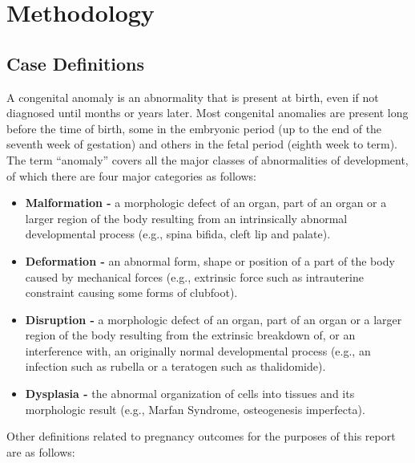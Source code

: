 \documentclass[
]{krantz}
\begin{document}
\mainmatter

\hypertarget{chapter1}{%
\chapter{Methodology}\label{chapter1}}

\hypertarget{section11}{%
\section{Case Definitions}\label{section11}}

A congenital anomaly is an abnormality that is present at birth, even if not diagnosed until months or years later. Most congenital anomalies are present long before the time of birth, some in the embryonic period (up to the end of the seventh week of gestation) and others in the fetal period (eighth week to term). The term ``anomaly'' covers all the major classes of abnormalities of development, of which there are four major categories as follows:

\begin{itemize}
\item
  \textbf{Malformation -} a morphologic defect of an organ, part of an organ or a larger region of the body resulting from an intrinsically abnormal developmental process (e.g., spina bifida, cleft lip and palate).
\item
  \textbf{Deformation -} an abnormal form, shape or position of a part of the body caused by mechanical forces (e.g., extrinsic force such as intrauterine constraint causing some forms of clubfoot).
\item
  \textbf{Disruption -} a morphologic defect of an organ, part of an organ or a larger region of the body resulting from the extrinsic breakdown of, or an interference with, an originally normal developmental process (e.g., an infection such as rubella or a teratogen such as thalidomide).
\item
  \textbf{Dysplasia -} the abnormal organization of cells into tissues and its morphologic result (e.g., Marfan Syndrome, osteogenesis imperfecta).
\end{itemize}

Other definitions related to pregnancy outcomes for the purposes of this report are as follows:
\end{document}
